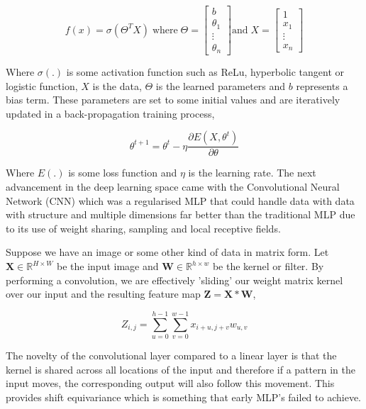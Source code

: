 \documentclass[honours,12pt]{unswthesis}
\numberwithin{equation}{section}
\begin{document}
\begin{equation}
    f(x) = \sigma(\Theta^T X)  \; \text{where}  \; \Theta= \begin{bmatrix} b \\ \theta_1 \\ \vdots \\ \theta_n \end{bmatrix} \text{and} \; X = \begin{bmatrix} 1 \\ x_1 \\ \vdots \\ x_n \end{bmatrix}
\end{equation}

\noindent Where $\sigma(.)$ is some activation function such as ReLu, hyperbolic tangent or logistic function, $X$ is the data, $\Theta$ is the learned parameters and $b$ represents a bias term.
These parameters are set to some initial values and are iteratively updated in a back-propagation training process,

\begin{equation}
    \theta^{t+1} = \theta^{t} - \eta\frac{\partial E(X, \theta^t)}{\partial\theta}
\end{equation}

\noindent Where $E(.)$ is some loss function and $\eta$ is the learning rate.
The next advancement in the deep learning space came with the Convolutional Neural Network (CNN) which was a regularised MLP that could
handle data with data with structure and multiple dimensions far better than the traditional MLP due to its use of weight sharing, sampling
and local receptive fields.\cite{Goodfellow-et-al-2016}

\noindent Suppose we have an image or some other kind of data in matrix form. Let $\textbf{X} \in \mathbb{R}^{H\times W}$ be the input image and
$\textbf{W} \in \mathbb{R}^{h\times w}$ be the kernel or filter. By performing a convolution, we are effectively 'sliding' our weight matrix kernel
over our input and the resulting feature map $\textbf{Z} = \textbf{X} \ast \textbf{W}$,

\begin{equation}
    Z_{i, j} = \sum_{u=0}^{h-1}\sum_{v=0}^{w-1} x_{i+u, j+v} w_{u, v}
\end{equation}

\noindent The novelty of the convolutional layer compared to a linear layer is that the kernel is shared across all locations of the input and therefore
if a pattern in the input moves, the corresponding output will also follow this movement. This provides shift equivariance which is something that early MLP's
failed to achieve. \cite{pml1Book}
\end{document}
